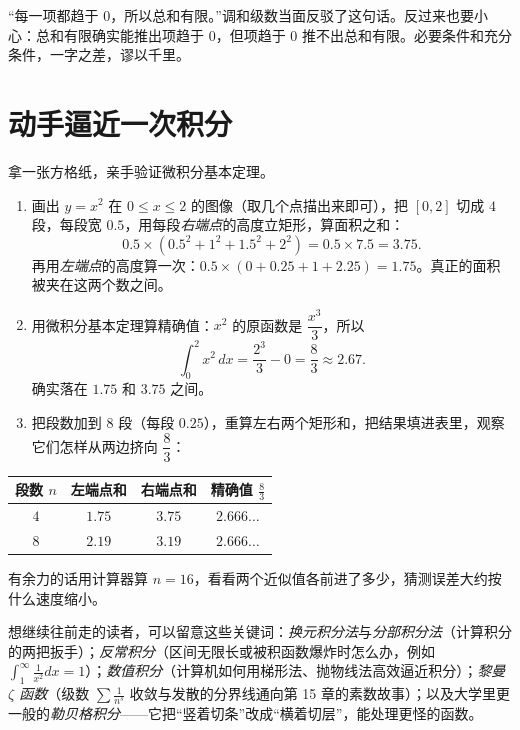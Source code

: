 \begin{fanli}
“每一项都趋于 $0$，所以总和有限。”调和级数当面反驳了这句话。反过来也要小心：总和有限确实能推出项趋于 $0$，但项趋于 $0$ 推不出总和有限。必要条件和充分条件，一字之差，谬以千里。
\end{fanli}

\section{动手逼近一次积分}

\begin{shiyan}
拿一张方格纸，亲手验证微积分基本定理。

\begin{enumerate}
  \item 画出 $y=x^{2}$ 在 $0\le x\le 2$ 的图像（取几个点描出来即可），把 $[0,2]$ 切成 $4$ 段，每段宽 $0.5$，用每段\emph{右端点}的高度立矩形，算面积之和：
  \[
  0.5\times(0.5^{2}+1^{2}+1.5^{2}+2^{2})=0.5\times 7.5=3.75 .
  \]
  再用\emph{左端点}的高度算一次：$0.5\times(0+0.25+1+2.25)=1.75$。真正的面积被夹在这两个数之间。
  \item 用微积分基本定理算精确值：$x^{2}$ 的原函数是 $\dfrac{x^{3}}{3}$，所以
  \[
  \int_0^2 x^{2}\,dx=\frac{2^{3}}{3}-0=\frac83\approx 2.67 .
  \]
  确实落在 $1.75$ 和 $3.75$ 之间。
  \item 把段数加到 $8$ 段（每段 $0.25$），重算左右两个矩形和，把结果填进表里，观察它们怎样从两边挤向 $\dfrac83$：
\end{enumerate}
\begin{center}
\begin{tabular}{cccc}
\toprule
段数 $n$ & 左端点和 & 右端点和 & 精确值 $\frac83$ \\
\midrule
$4$ & $1.75$ & $3.75$ & $2.666\ldots$ \\
$8$ & $2.19$ & $3.19$ & $2.666\ldots$ \\
\bottomrule
\end{tabular}
\end{center}
有余力的话用计算器算 $n=16$，看看两个近似值各前进了多少，猜测误差大约按什么速度缩小。
\end{shiyan}

\begin{pandeng}
想继续往前走的读者，可以留意这些关键词：\emph{换元积分法}与\emph{分部积分法}（计算积分的两把扳手）；\emph{反常积分}（区间无限长或被积函数爆炸时怎么办，例如 $\int_1^{\infty}\frac{1}{x^{2}}dx=1$）；\emph{数值积分}（计算机如何用梯形法、抛物线法高效逼近积分）；\emph{黎曼 $\zeta$ 函数}（级数 $\sum\frac{1}{n^{s}}$ 收敛与发散的分界线通向第 15 章的素数故事）；以及大学里更一般的\emph{勒贝格积分}——它把“竖着切条”改成“横着切层”，能处理更怪的函数。
\end{pandeng}

